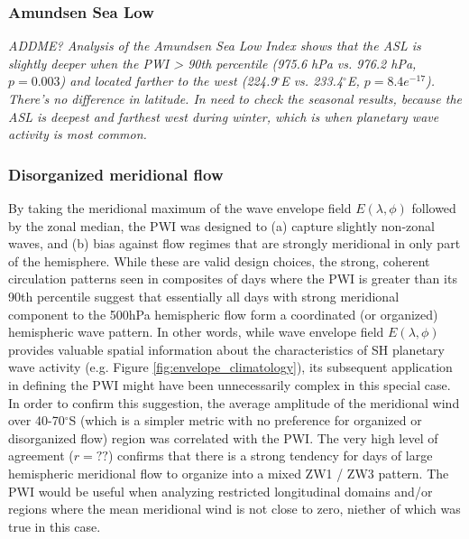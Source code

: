 \subsubsection{Amundsen Sea Low}

\textit{ADDME? Analysis of the Amundsen Sea Low Index \citep{Turner2013} shows that the ASL is slightly deeper when the PWI > 90th percentile (975.6 hPa vs. 976.2 hPa, $p = 0.003$) and located farther to the west (224.9$^{\circ}$E vs. 233.4$^{\circ}$E, $p = 8.4e^{-17}$). There's no difference in latitude.  In need to check the seasonal results, because the ASL is deepest and farthest west during winter, which is when planetary wave activity is most common.}  

\subsubsection{Disorganized meridional flow}

By taking the meridional maximum of the wave envelope field $E(\lambda,\phi)$ followed by the zonal median, the PWI was designed to (a) capture slightly non-zonal waves, and (b) bias against flow regimes that are strongly meridional in only part of the hemisphere. While these are valid design choices, the strong, coherent circulation patterns seen in composites of days where the PWI is greater than its 90th percentile suggest that essentially all days with strong meridional component to the 500hPa hemispheric flow form a coordinated (or organized) hemispheric wave pattern. In other words, while wave envelope field $E(\lambda,\phi)$ provides valuable spatial information about the characteristics of SH planetary wave activity (e.g. Figure \ref{fig:envelope_climatology}), its subsequent application in defining the PWI might have been unnecessarily complex in this special case. In order to confirm this suggestion, the average amplitude of the meridional wind over 40-70$^{\circ}$S (which is a simpler metric with no preference for organized or disorganized flow) region was correlated with the PWI. The very high level of agreement ($r = ??$) confirms that there is a strong tendency for days of large hemispheric meridional flow to organize into a mixed ZW1 / ZW3 pattern. The PWI would be useful when analyzing restricted longitudinal domains and/or regions where the mean meridional wind is not close to zero, niether of which was true in this case.